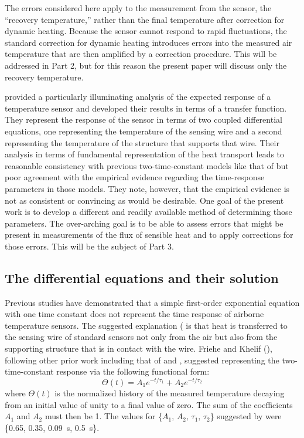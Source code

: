 \documentclass[11pt,twoside,american,12pt,twoside,american]{article}\usepackage[]{graphicx}\usepackage[]{color}
\begin{document}
The errors considered here apply to the measurement from the sensor,
the ``recovery temperature,'' rather than the final temperature
after correction for dynamic heating. Because the sensor cannot respond
to rapid fluctuations, the standard correction for dynamic heating
introduces errors into the measured air temperature that are then
amplified by a correction procedure. This will be addressed in Part
2, but for this reason the present paper will discuss only the recovery
temperature.

\citet{PayneEtAl1994} provided a particularly illuminating analysis
of the expected response of a temperature sensor and developed their
results in terms of a transfer function. They represent the response
of the sensor in terms of two coupled differential equations, one
representing the temperature of the sensing wire and a second representing
the temperature of the structure that supports that wire. Their analysis
in terms of fundamental representation of the heat transport leads
to reasonable consistency with previous two-time-constant models like
that of \citet{mccarthy1973method} but poor agreement with the empirical
evidence regarding the time-response parameters in those models. They
note, however, that the empirical evidence is not as consistent or
convincing as would be desirable. One goal of the present work is
to develop a different and readily available method of determining
those parameters. The over-arching goal is to be able to assess errors
that might be present in measurements of the flux of sensible heat
and to apply corrections for those errors. This will be the subject
of Part 3.

\subsection{The differential equations and their solution}

Previous studies have demonstrated that a simple first-order exponential
equation with one time constant does not represent the time response
of airborne temperature sensors. The suggested explanation (\citet{NCAR_OpenSky_TECH-NOTE-000-000-000-064}
is that heat is transferred to the sensing wire of standard sensors
not only from the air but also from the supporting structure that
is in contact with the wire. Friehe and Khelif (\citet{FrieheKhelif1992}),
following other prior work including that of \citet{rodi1972analysis}
and \citet{mccarthy1973method}, suggested representing the two-time-constant
response via the following functional form:\\
\begin{equation}
\Theta(t)=A_{1}e^{-t/\tau_{1}}+A_{2}e^{-t/\tau_{2}}\label{eq:FrieheKehlif}
\end{equation}
where $\Theta(t)$ is the normalized history of the measured temperature
decaying from an initial value of unity to a final value of zero.
The sum of the coefficients $A_{1}$ and $A_{2}$ must then be 1.
The values for \{$A_{1},\,A_{2},\,\tau_{1},\,\tau_{2}$\} suggested
by \citet{FrieheKhelif1992} were \{0.65, 0.35, 0.09~s, 0.5~s\}.
\end{document}

